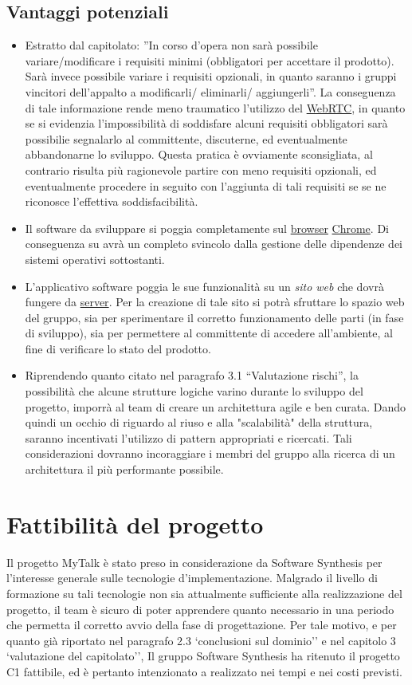 \subsection{Vantaggi potenziali}
\begin{itemize}
	\item Estratto dal capitolato: ''In corso d'opera non sarà possibile variare/modificare i requisiti minimi (obbligatori per accettare il prodotto). Sarà invece possibile variare i requisiti opzionali, in quanto saranno i gruppi vincitori dell'appalto a modificarli/ eliminarli/ aggiungerli''. La conseguenza di tale informazione rende meno traumatico l'utilizzo del \underline{WebRTC}, in quanto se si evidenzia l'impossibilità di soddisfare alcuni requisiti obbligatori sarà possibilie segnalarlo al committente, discuterne, ed eventualmente abbandonarne lo sviluppo. Questa pratica è ovviamente sconsigliata, al contrario risulta più ragionevole partire con meno requisiti opzionali, ed eventualmente procedere in seguito con l'aggiunta di tali requisiti se se ne riconosce l'effettiva soddisfacibilità.
	\item Il software da sviluppare si poggia completamente sul \underline{browser} \underline{Chrome}. Di conseguenza su avrà un completo svincolo dalla gestione delle dipendenze dei sistemi operativi sottostanti.
	\item L'applicativo software poggia le sue funzionalità su un \textit{sito web} che dovrà fungere da \underline{server}. Per la creazione di tale sito si potrà sfruttare lo spazio web del gruppo, sia per sperimentare il corretto funzionamento delle parti (in fase di sviluppo), sia per permettere al committente di accedere all'ambiente, al fine di verificare lo stato del prodotto.
	\item Riprendendo quanto citato nel paragrafo 3.1 ``Valutazione rischi'', la possibilità che alcune strutture logiche varino durante lo sviluppo del progetto, imporrà al team di creare un architettura agile e ben curata. Dando quindi un occhio di riguardo al riuso e alla "scalabilità" della struttura, saranno incentivati l'utilizzo di pattern appropriati e ricercati. Tali considerazioni dovranno incoraggiare i membri del gruppo alla ricerca di un architettura il più performante possibile.
\end{itemize}
\clearpage
\section{Fattibilità del progetto}
Il progetto MyTalk è stato preso in considerazione da Software Synthesis per l'interesse generale sulle tecnologie d'implementazione. Malgrado il livello di formazione su tali tecnologie non sia attualmente sufficiente alla realizzazione del progetto, il team è sicuro di poter apprendere quanto necessario in una periodo che permetta il corretto avvio della fase di progettazione. Per tale motivo, e per quanto già riportato nel paragrafo 2.3 `conclusioni sul dominio'' e nel capitolo 3 `valutazione del capitolato'', Il gruppo Software Synthesis ha ritenuto il progetto C1 fattibile, ed è pertanto intenzionato a realizzato nei tempi e nei costi previsti.
\clearpage
